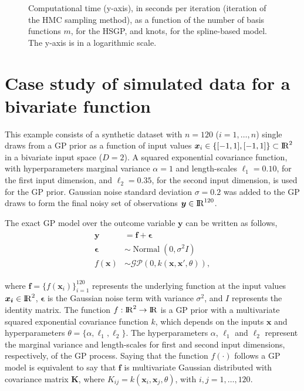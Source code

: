 \documentclass[onecolumn,a4paper,11pt]{article}
\DeclareMathOperator{\Normal}{Normal}
\begin{document}
\begin{figure}
\centering
{}
\caption{Computational time (y-axis), in seconds per iteration (iteration of the HMC sampling method), as a function of the number of basis functions $m$, for the HSGP, and knots, for the spline-based model. The y-axis is in a logarithmic scale.}
  \label{ch5_fig14_1_time_gaydata}
\end{figure}


\section{Case study of simulated data for a bivariate function}

This example consists of a synthetic dataset with $n=120$ ($i=1,\dots,n$) single draws from a GP prior as a function of input values $\bm{x}_i \in \{[-1,1],[-1,1]\} \subset {\rm I\!R}^2$ in a bivariate input space ($D=2$). A squared exponential covariance function, with hyperparameters marginal variance $\alpha=1$ and length-scales $\ell_1=0.10$, for the first input dimension, and $\ell_2=0.35$, for the second input dimension, is used for the GP prior. Gaussian noise standard deviation $\sigma=0.2$ was added to the GP draws to form the final noisy set of observations $\bm{y} \in {\rm I\!R}^{120}$.

The exact GP model over the outcome variable $\bm{y}$ can be written as follows,
%
\begin{eqnarray*}\label{ch5_eq_latentgp_simudata2}
\begin{split}
\bm{y} &= \bm{f} + \bm{\epsilon} \\
\bm{\epsilon} &\sim \Normal(0, \sigma^2  I) \\
f(\bm{x}) &\sim \mathcal{GP}(0, k(\bm{x}, \bm{x}', \theta)),
\end{split}
\end{eqnarray*}

\noindent where $\bm{f}=\{f(\bm{x}_i)\}_{i=1}^{120}$ represents the underlying function at the input values $\bm{x_i}\in {\rm I\!R}^{2}$, $\bm{\epsilon}$ is the Gaussian noise term with variance $\sigma^2$, and $I$ represents the identity matrix. The function $f:{\rm I\!R}^2 \to {\rm I\!R}$ is a GP prior with a multivariate squared exponential covariance function $k$, which depends on the inputs $\bm{x}$ and hyperparameters $\theta=\{\alpha,\ell_1,\ell_2\}$. The hyperparameters $\alpha$, $\ell_1$ and $\ell_2$ represent the marginal variance and length-scales for first and second input dimensions, respectively, of the GP process. Saying that the function $f(\cdot)$ follows a GP model is equivalent to say that $\bm{f}$ is multivariate Gaussian distributed with covariance matrix $\bm{K}$, where $K_{ij}=k(\bm{x}_i,\bm{x}_j,\theta)$, with $i,j=1,\dots,120$.
\end{document}
